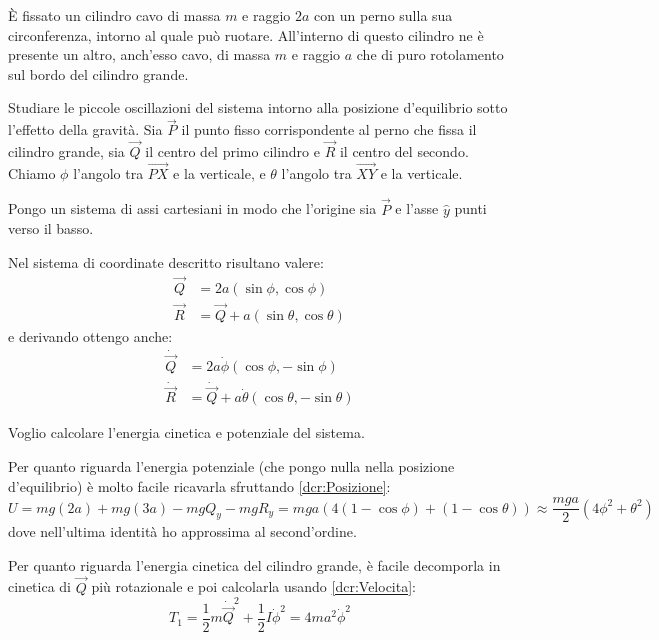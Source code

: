 \documentclass[../main.tex]{subfiles}
\begin{document}
\textex
È fissato un cilindro cavo di massa $m$ e raggio $2a$ con un perno sulla sua circonferenza, intorno al quale può ruotare.
All'interno di questo cilindro ne è presente un altro, anch'esso cavo, di massa $m$ e raggio $a$ che di puro rotolamento sul bordo del cilindro grande.

Studiare le piccole oscillazioni del sistema intorno alla posizione d'equilibrio sotto l'effetto della gravità.
\solution
Sia $\vec P$ il punto fisso corrispondente al perno che fissa il cilindro grande, sia $\vec Q$ il centro del primo cilindro e $\vec R$ il centro del secondo. Chiamo $\phi$ l'angolo tra $\overrightarrow{PX}$ e la verticale, e $\theta$ l'angolo tra $\overrightarrow{XY}$ e la verticale.

Pongo un sistema di assi cartesiani in modo che l'origine sia $\vec P$ e l'asse $\hat y$ punti verso il basso.

Nel sistema di coordinate descritto risultano valere:
\begin{equation}\begin{split}\label{dcr:Posizione}
	\vec Q&=2a(\sin\phi,\cos\phi) \\
	\vec R&=\vec Q + a(\sin\theta,\cos\theta)
\end{split}\end{equation}
e derivando ottengo anche:
\begin{equation}\begin{split}\label{dcr:Velocita}
	\dot{\vec Q}&=2a\dot{\phi}(\cos\phi,-\sin\phi) \\
	\dot{\vec R}&=\dot{\vec Q} + a\dot{\theta}(\cos\theta,-\sin\theta)
\end{split}\end{equation}

Voglio calcolare l'energia cinetica e potenziale del sistema.

Per quanto riguarda l'energia potenziale (che pongo nulla nella posizione d'equilibrio) è molto facile ricavarla sfruttando \cref{dcr:Posizione}:
\begin{equation}\label{dcr:Potenziale}
	U=mg(2a)+mg(3a)-mgQ_y-mgR_y=mga\left(4(1-\cos\phi)+(1-\cos\theta)\right)
	\approx \frac{mga}2\left(4\phi^2+\theta^2\right)
\end{equation}
dove nell'ultima identità ho approssima al second'ordine.

Per quanto riguarda l'energia cinetica del cilindro grande, è facile decomporla in cinetica di $\vec Q$ più rotazionale e poi calcolarla usando \cref{dcr:Velocita}:
\begin{equation}\label{dcr:Cinetica1}
	T_1=\frac 12 m {\dot{\vec Q}}^2+\frac 12I{\dot\phi}^2=4ma^2\dot\phi^2
\end{equation}
\end{document}
